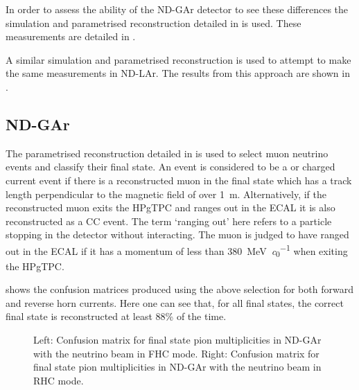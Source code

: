 In order to assess the ability of the ND-GAr detector to see these differences the simulation and parametrised reconstruction detailed in  is used.
These measurements are detailed in .

A similar simulation and parametrised reconstruction is used to attempt to make the same measurements in ND-LAr. 
The results from this approach are shown in .

\subsection{ND-GAr}
\label{sec:dune_ndrwt:pionMulti:gar}

The parametrised reconstruction detailed in  is used to select muon neutrino events and classify their final state.
An event is considered to be a \numu or \anumu charged current event if there is a reconstructed muon in the final state which has a track length perpendicular to the magnetic field of over \SI{1}{\metre}.
Alternatively, if the reconstructed muon exits the HPgTPC and ranges out in the ECAL it is also reconstructed as a \numu CC event.
The term `ranging out' here refers to a particle stopping in the detector without interacting.
The muon is judged to have ranged out in the ECAL if it has a momentum of less than \SI{380}{\MeV\per\clight} when exiting the HPgTPC. 

 shows the confusion matrices produced using the above selection for both forward and reverse horn currents. 
Here one can see that, for all final states, the correct final state is reconstructed at least 88\% of the time.

\begin{figure}[h]
	\begin{minipage}[t]{.5\linewidth}
		\begin{adjustbox}{max totalsize=\linewidth, center}
			
		\end{adjustbox}
	\end{minipage}
	\hfill
	\begin{minipage}[t]{.5\linewidth}
		\begin{adjustbox}{max totalsize=\linewidth, center}
			
		\end{adjustbox}
	\end{minipage}
	\caption[Confusion matrices for final state pion multiplicities in ND-GAr.]{Left: Confusion matrix for final state pion multiplicities in ND-GAr with the neutrino beam in FHC mode. Right: Confusion matrix for final state pion multiplicities in ND-GAr with the neutrino beam in RHC mode.}
	\label{fig:confusMatPi}
\end{figure}

